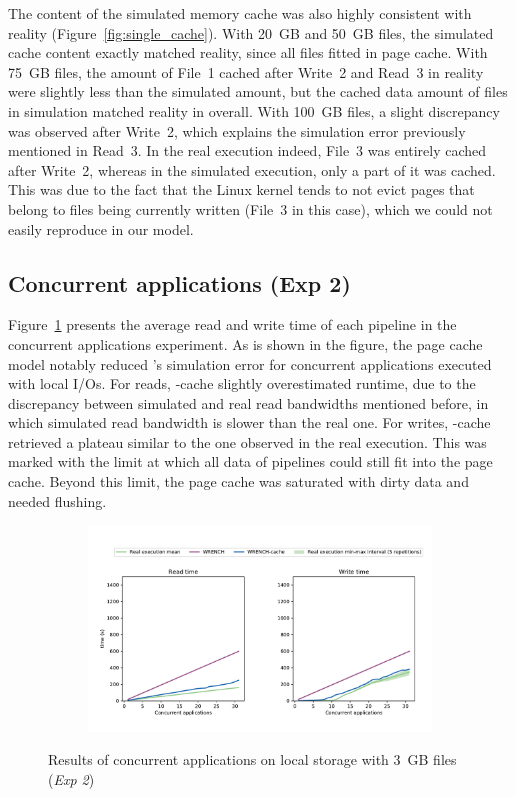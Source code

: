 The content of the simulated memory cache was also highly consistent with 
reality (Figure~\ref{fig:single_cache}). With 20~GB and 50~GB files, 
the simulated cache content exactly matched reality, since all files fitted 
in page cache. With 75~GB files, the amount of File~1 cached after Write~2 
and Read~3 in reality were slightly less than the simulated amount, but 
the cached data amount of files in simulation matched reality in overall.
With 100~GB files, a slight discrepancy was observed after Write~2, 
which explains the simulation error previously mentioned in Read~3. 
In the real execution indeed, File~3 was entirely cached after Write~2, 
whereas in the simulated execution, only a part of it was cached. 
This was due to the fact that the Linux kernel tends to not evict pages that
belong to files being currently written (File~3 in this case), which we could 
not easily reproduce in our model.

\FloatBarrier

\subsection{Concurrent applications (Exp 2)}

Figure~\ref{fig:multi_local} presents the average read and write time 
of each pipeline in the concurrent applications experiment.
As is shown in the figure, the page cache model notably reduced \wrench's 
simulation error for concurrent applications executed with local I/Os. 
For reads, \wrench-cache slightly overestimated runtime, due to the 
discrepancy between simulated and real read bandwidths mentioned before, 
in which simulated read bandwidth is slower than the real one.
For writes, \wrench-cache retrieved a plateau similar to the one observed 
in the real execution. This was marked with the limit at which all data of 
pipelines could still fit into the page cache. Beyond this limit, the page cache 
was saturated with dirty data and needed flushing.

\begin{figure}[!h]
    \begin{subfigure}{\linewidth}
        \centering
        \includegraphics[width=\linewidth]{result/multi/figures/multi_local.pdf}
    \end{subfigure}
    \caption{Results of concurrent applications on local storage with 3~GB files 
    (\textit{Exp 2})}
    \label{fig:multi_local}
\end{figure}

